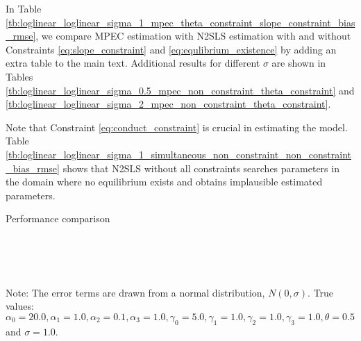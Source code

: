 \documentclass[11pt, a4paper]{article}
\begin{document}
In Table \ref{tb:loglinear_loglinear_sigma_1_mpec_theta_constraint_slope_constraint_bias_rmse}, we compare MPEC estimation with N2SLS estimation with and without Constraints \eqref{eq:slope_constraint} and \eqref{eq:equlibrium_existence} by adding an extra table to the main text.
Additional results for different $\sigma$ are shown in Tables \ref{tb:loglinear_loglinear_sigma_0.5_mpec_non_constraint_theta_constraint} and \ref{tb:loglinear_loglinear_sigma_2_mpec_non_constraint_theta_constraint}.

Note that Constraint \eqref{eq:conduct_constraint} is crucial in estimating the model.
Table \ref{tb:loglinear_loglinear_sigma_1_simultaneous_non_constraint_non_constraint_bias_rmse} shows that N2SLS without all constraints searches parameters in the domain where no equilibrium exists and obtains implausible estimated parameters.

\begin{table}[!htbp]
  \begin{center}
      \caption{Performance comparison}
      \label{tb:loglinear_loglinear_sigma_1_mpec_theta_constraint_slope_constraint_bias_rmse} 
    \\
    \\
    \subfloat[MPEC ]{}\\
  \end{center}
  \footnotesize
  Note: The error terms are drawn from a normal distribution, $N(0, \sigma)$. True values: $\alpha_0=20.0,\alpha_1=1.0,\alpha_2=0.1,\alpha_3=1.0,\gamma_0=5.0,\gamma_1=1.0,\gamma_2=1.0,\gamma_3=1.0,\theta=0.5$ and $\sigma=1.0$.
\end{table} 
\end{document}
